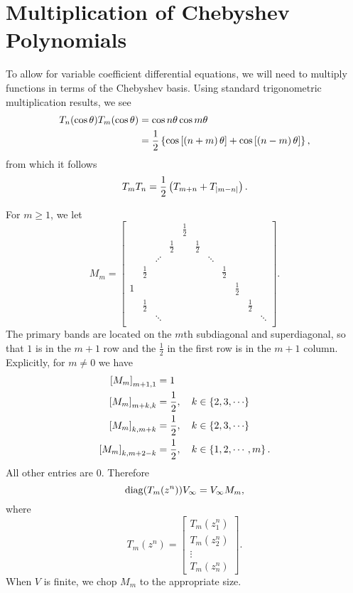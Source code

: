 \section{Multiplication of Chebyshev Polynomials}
\label{sec:CV_mult}

To allow for variable coefficient differential equations,
we will need to multiply functions in terms of the Chebyshev basis.
Using standard trigonometric multiplication results, we see
%
\begin{align}
    T_{n}(\cos\theta)T_{m}(\cos\theta) &= \cos n\theta \cos m\theta
        \nonumber\\
    &= \frac{1}{2}\left\{ \cos\left[ \left( n+m \right)\theta \right] + \cos\left[ 
        \left( n-m \right)\theta \right] \right\},
\end{align}
%
from which it follows
%
\begin{equation}
    T_{m}T_{n} = \frac{1}{2}\left( T_{m+n} + T_{\left| m-n \right|} \right).
\end{equation}

For $m\ge1$, we let
%
\begin{equation}
    M_{m} = \begin{bmatrix}
        & & & & \frac{1}{2} \\
        & & & \frac{1}{2} & & \frac{1}{2} \\
        & & \iddots & & & & \ddots \\
        & \frac{1}{2} & & & & & & \frac{1}{2} \\
        1 & & & & & & & & \frac{1}{2} \\
        & \frac{1}{2} & & & & & & & & \frac{1}{2} \\
        & & \ddots & & & & & & & & \ddots \\
    \end{bmatrix}.
\end{equation}
%
The primary bands are located on
the $m$th subdiagonal and superdiagonal, so that
$1$ is in the $m+1$ row and the $\frac{1}{2}$ in
the first row is in the $m+1$ column.
Explicitly, for $m\ne0$ we have
%
\begin{align}
    \brackets{M_{m}}_{m+1,1} &= 1 \nonumber\\
    \brackets{M_{m}}_{m+k,k} &= \frac{1}{2},\quad k\in\braces{2,3,\cdots}
         \nonumber\\
    \brackets{M_{m}}_{k,m+k} &= \frac{1}{2},\quad k\in\braces{2,3,\cdots}
         \nonumber\\
    \brackets{M_{m}}_{k,m+2-k} &= \frac{1}{2}, \quad k\in\braces{1,2,\cdots,m}.
\end{align}
%
All other entries are 0.
Therefore
%
\begin{equation}
    \operatorname{diag}(T_{m}(z^{n}))V_{\infty} = V_{\infty}M_{m},
\end{equation}
%
where
%
\begin{equation}
    T_{m}(z^{n}) = \begin{bmatrix}
        T_{m}(z_{1}^{n}) \\ T_{m}(z_{2}^{n}) \\ \vdots \\ T_{m}(z_{n}^{n})
    \end{bmatrix}.
\end{equation}
%
When $V$ is finite, we chop $M_{m}$ to the appropriate size.

